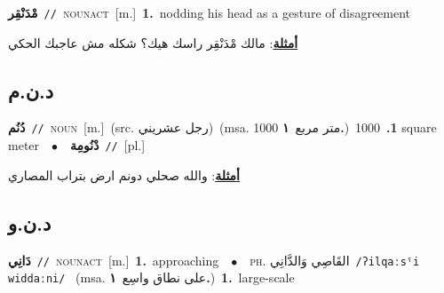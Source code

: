 \documentclass[10pt,a4paper,twoside]{article} %
\begin{document}
\begin{multicols}{2}
{\setlength\topsep{0pt}\textbf{\foreignlanguage{arabic}{مْدَنْقِر}}\ {\color{gray}\texttt{//}\color{black}}\ \textsc{noun\textunderscore act}\ [m.]\ \textbf{1.}~nodding his head as a gesture of disagreement\  \begin{flushright}\color{gray}\foreignlanguage{arabic}{\textbf{\underline{\foreignlanguage{arabic}{أمثلة}}}: مالك مْدَنْقِر راسك هيك؟ شكله مش عاجبك الحكي}\end{flushright}\color{black}} \vspace{2mm}

\vspace{-3mm}
\subsection*{\color{blue}\foreignlanguage{arabic}{د.ن.م}\color{blue}{ (ntws)}} 

{\setlength\topsep{0pt}\textbf{\foreignlanguage{arabic}{دُنُم}}\ {\color{gray}\texttt{//}\color{black}}\ \textsc{noun}\ [m.]\ (src. \color{gray}\foreignlanguage{arabic}{رجل عشريني}\color{black})\ \color{gray}(msa. \foreignlanguage{arabic}{1000 متر مربع}~\foreignlanguage{arabic}{\textbf{١.}})\color{black}\ \textbf{1.}~1000 square meter\ \ $\bullet$\ \ \setlength\topsep{0pt}\textbf{\foreignlanguage{arabic}{دْنُومِة}}\ {\color{gray}\texttt{//}\color{black}}\ [pl.]\  \begin{flushright}\color{gray}\foreignlanguage{arabic}{\textbf{\underline{\foreignlanguage{arabic}{أمثلة}}}: والله صحلي دونم ارض بتراب المصاري}\end{flushright}\color{black}} \vspace{2mm}

\vspace{-3mm}
\subsection*{\color{blue}\foreignlanguage{arabic}{د.ن.و}\color{blue}{}} 

{\setlength\topsep{0pt}\textbf{\foreignlanguage{arabic}{دَانِي}}\ {\color{gray}\texttt{//}\color{black}}\ \textsc{noun\textunderscore act}\ [m.]\ \textbf{1.}~approaching\ \ $\bullet$\ \ \textsc{ph.} \color{gray} \foreignlanguage{arabic}{القَاصِي وَالدَّانِي}\color{black}\ {\color{gray}\texttt{/{\sffamily ʔilqaːsˤi widdaːni}/}\color{black}}\ \color{gray} (msa. \foreignlanguage{arabic}{على نطاق واسِع}~\foreignlanguage{arabic}{\textbf{١.}})\color{black}\ \textbf{1.}~large-scale\ } \vspace{2mm}


\end{multicols}
\end{document}

